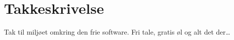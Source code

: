 \section{Takkeskrivelse}


Tak til miljøet omkring den frie software. Fri tale, gratis øl og alt
det der\dots {}


